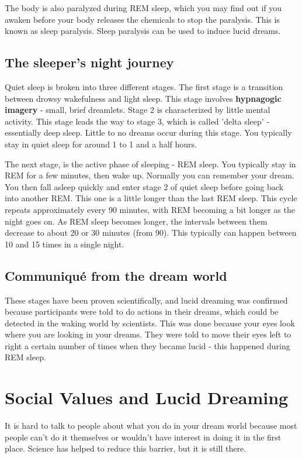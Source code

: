 \documentclass{report}
\begin{document}
The body is also paralyzed during REM sleep, which you may find out if you awaken before your body releases the chemicals to stop the paralysis. This is known as sleep paralysis. Sleep paralysis can be used to induce lucid dreams.

\subsection{The sleeper's night journey}
Quiet sleep is broken into three different stages. The first stage is a transition between drowsy wakefulness and light sleep. This stage involves \textbf{hypnagogic imagery} - small, brief dreamlets. Stage 2 is characterized by little mental activity. This stage leads the way to stage 3, which is called 'delta sleep' - essentially deep sleep. Little to no dreams occur during this stage. You typically stay in quiet sleep for around 1 to 1 and a half hours.

The next stage, is the active phase of sleeping - REM sleep. You typically stay in REM for a few minutes, then wake up. Normally you can remember your dream. You then fall asleep quickly and enter stage 2 of quiet sleep before going back into another REM. This one is a little longer than the last REM sleep. This cycle repeats approximately every 90 minutes, with REM becoming a bit longer as the night goes on. As REM sleep becomes longer, the intervals between them decrease to about 20 or 30 minutes (from 90). This typically can happen between 10 and 15 times in a single night.

\subsection{Communiqu\'{e} from the dream world}
These stages have been proven scientifically, and lucid dreaming was confirmed because participants were told to do actions in their dreams, which could be detected in the waking world by scientists. This was done because your eyes look where you are looking in your dreams. They were told to move their eyes left to right a certain number of times when they became lucid - this happened during REM sleep.

\section{Social Values and Lucid Dreaming}
It is hard to talk to people about what you do in your dream world because most people can't do it themselves or wouldn't have interest in doing it in the first place. Science has helped to reduce this barrier, but it is still there.
\end{document}
